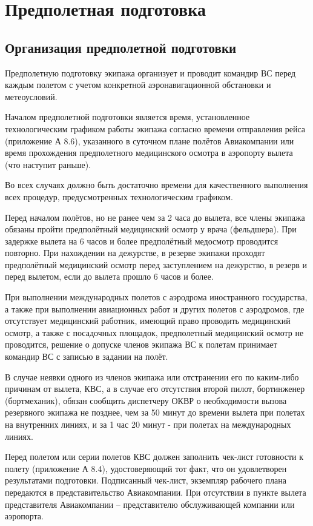 \section{Предполетная подготовка}

\subsection{Организация предполетной подготовки}
\setcounter{subsect}{1}

Предполетную подготовку экипажа организует и проводит командир ВС перед каждым полетом с учетом конкретной аэронавигационной обстановки и метеоусловий.

Началом предполетной подготовки является время, установленное технологическим графиком работы экипажа согласно времени отправления рейса (приложение А 8.6), указанного в суточном плане полётов Авиакомпании или время прохождения предполетного медицинского осмотра в аэропорту вылета (что наступит раньше).

Во всех случаях должно быть достаточно времени для качественного выполнения всех процедур, предусмотренных технологическим графиком.

Перед началом полётов, но не ранее чем за 2 часа до вылета, все члены экипажа обязаны пройти предполётный медицинский осмотр у врача (фельдшера). При задержке вылета на 6 часов и более предполётный медосмотр проводится повторно. При нахождении на дежурстве, в резерве экипажи проходят предполётный медицинский осмотр перед заступлением на дежурство, в резерв и перед вылетом, если до вылета прошло 6 часов и более.

При выполнении международных полетов с аэродрома иностранного государства, а также при выполнении авиационных работ и других полетов с аэродромов, где отсутствует медицинский работник, имеющий право проводить медицинский осмотр, а также с посадочных площадок, предполетный медицинский осмотр не проводится, решение о допуске членов экипажа ВС к полетам принимает командир ВС с записью в задании на полёт.

В случае неявки одного из членов экипажа или отстранении его по каким-либо причинам от вылета, КВС, а в случае его отсутствия второй пилот, бортинженер (бортмеханик), обязан сообщить диспетчеру ОКВР о необходимости вызова резервного экипажа не позднее, чем за 50 минут до времени вылета при полетах на внутренних линиях, и за 1 час 20 минут - при полетах на международных линиях.

Перед полетом или серии полетов КВС должен заполнить чек-лист готовности к полету (приложение А 8.4), удостоверяющий тот факт, что он удовлетворен результатами подготовки.
Подписанный чек-лист, экземпляр рабочего плана передаются в представительство Авиакомпании.
При отсутствии в пункте вылета представителя Авиакомпании – представителю обслуживающей компании или аэропорта.

